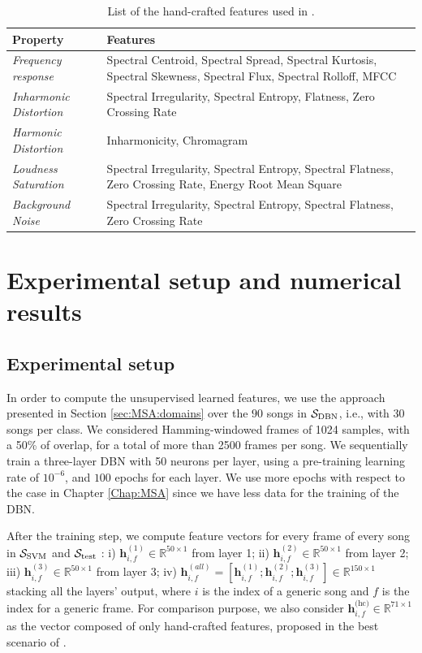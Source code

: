 \begin{table}[t!]
\caption{List of the hand-crafted features used in \cite{Bestagini2013b}.}
\label{tab:Bootleg:LLFs}
\centering
\large
\bgroup
\def\arraystretch{1.5}
\begin{tabular}{||p{}|p{}||}
\hline
\hline
\textbf{Property} & \textbf{Features}\\ 
\hline
\hline
\textit{Frequency response} & Spectral Centroid, Spectral Spread, Spectral Kurtosis, Spectral Skewness, Spectral Flux, Spectral Rolloff, MFCC \\
\hline
\textit{Inharmonic Distortion}    & Spectral Irregularity, Spectral Entropy,
Flatness, Zero Crossing Rate \\
\hline
\textit{Harmonic Distortion} & Inharmonicity, Chromagram \\
\hline
\textit{Loudness Saturation} & Spectral Irregularity, Spectral Entropy, Spectral Flatness, Zero Crossing Rate, Energy Root Mean Square \\
\hline
\textit{Background Noise} & Spectral Irregularity, Spectral Entropy,
Spectral Flatness, Zero Crossing Rate \\
\hline
\hline
\end{tabular}
\egroup
\end{table}


\section{Experimental setup and numerical results}
\subsection{Experimental setup}
In order to compute the unsupervised learned features, we use the approach presented in Section \ref{sec:MSA:domains} over the $90$ songs in $\mathcal{S}_\text{DBN}$, i.e., with $30$ songs per class. We considered Hamming-windowed frames of 1024 samples, with a 50\% of overlap, for a total of more than 2500 frames per song. We sequentially train a three-layer DBN with 50 neurons per layer, using a pre-training learning rate of $10^{-6}$, and $100$ epochs for each layer. We use more epochs with respect to the case in Chapter \ref{Chap:MSA} since we have less data for the training of the DBN. 

After the training step, we compute feature vectors for every frame of every song in $\mathcal{S}_\text{SVM}$ and $\mathcal{S}_\text{test}$ : i) $\mathbf{h}^{(1)}_{i,f} \in \mathbb{R}^{50 \times 1}$ from layer 1; ii) $\mathbf{h}^{(2)}_{i,f} \in \mathbb{R}^{50 \times 1}$ from layer 2; iii) $\mathbf{h}^{(3)}_{i,f} \in \mathbb{R}^{50 \times 1}$ from layer 3; iv) $\mathbf{h}^{(all)}_{i,f} = [\mathbf{h}^{(1)}_{i,f}; \mathbf{h}^{(2)}_{i,f}; \mathbf{h}^{(3)}_{i,f}] \in \mathbb{R}^{150 \times 1}$ stacking all the layers' output, where $i$ is the index of a generic song and $f$ is the index for a generic frame. For comparison purpose, we also consider $\mathbf{h}_{i,f}^\text{(hc)} \in \mathbb{R}^{71 \times 1}$ as the vector composed of only hand-crafted features, proposed in the best scenario of \cite{Bestagini2013b}.

